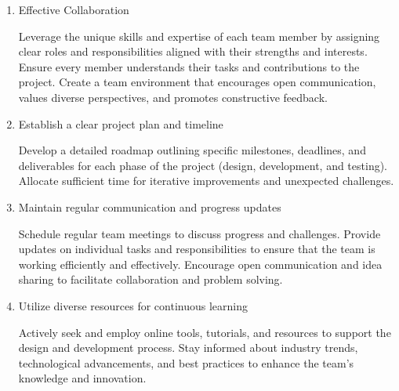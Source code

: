 \begin{enumerate}[topsep=3pt]
    \item Effective Collaboration 
        \begin{itemize}[leftmargin=0.25cm,itemindent=0.5cm, noitemsep, topsep=1pt, label=\textbullet]
            \myitemtwo Leverage the unique skills and expertise of each team member by assigning clear roles and responsibilities aligned with their strengths and interests.
            \myitemtwo Ensure every member understands their tasks and contributions to the project.
            \myitemtwo Create a team environment that encourages open communication, values diverse perspectives, and promotes constructive feedback.
        \end{itemize}
    \item Establish a clear project plan and timeline 
        \begin{itemize}[leftmargin=0.25cm,itemindent=0.5cm, noitemsep, topsep=1pt, label=\textbullet]
            \myitemtwo Develop a detailed roadmap outlining specific milestones, deadlines, and deliverables for each phase of the project (design, development, and testing).
            \myitemtwo Allocate sufficient time for iterative improvements and unexpected challenges.
        \end{itemize}
    \item Maintain regular communication and progress updates
        \begin{itemize}[leftmargin=0.25cm,itemindent=0.5cm, noitemsep, topsep=1pt, label=\textbullet]
            \myitemtwo Schedule regular team meetings to discuss progress and challenges.
            \myitemtwo Provide updates on individual tasks and responsibilities to ensure that the team is working efficiently and effectively.
            \myitemtwo Encourage open communication and idea sharing to facilitate collaboration and problem solving.
        \end{itemize}
    \item Utilize diverse resources for continuous learning
        \begin{itemize}[leftmargin=0.25cm,itemindent=0.5cm, noitemsep, topsep=1pt, label=\textbullet]
            \myitemtwo Actively seek and employ online tools, tutorials, and resources to support the design and development process.
            \myitemtwo Stay informed about industry trends, technological advancements, and best practices to enhance the team’s knowledge and innovation.
        \end{itemize}

\end{enumerate}

